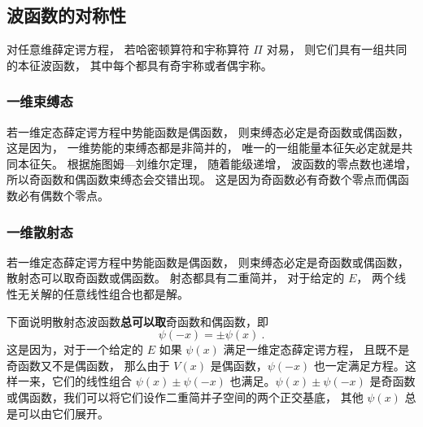 \subsection{波函数的对称性}
对任意维薛定谔方程， 若哈密顿算符和宇称算符 $\Pi$ 对易， 则它们具有一组共同的本征波函数， 其中每个都具有奇宇称或者偶宇称。

\subsubsection{一维束缚态}
若一维定态薛定谔方程中势能函数是偶函数， 则束缚态必定是奇函数或偶函数， 这是因为， 一维势能的束缚态都是非简并的， 唯一的一组能量本征矢必定就是共同本征矢。 根据施图姆—刘维尔定理， 随着能级递增， 波函数的零点数也递增， 所以奇函数和偶函数束缚态会交错出现。 这是因为奇函数必有奇数个零点而偶函数必有偶数个零点。

\subsubsection{一维散射态}
若一维定态薛定谔方程中势能函数是偶函数， 则束缚态必定是奇函数或偶函数， 散射态可以取奇函数或偶函数。 射态都具有二重简并， 对于给定的 $E$， 两个线性无关解的任意线性组合也都是解。

下面说明散射态波函数\textbf{总可以取}奇函数和偶函数，即
\begin{equation}\label{eq_SchEq_3}
\psi(-x) = \pm \psi(x)~.
\end{equation}
这是因为，对于一个给定的 $E$ 如果 $\psi(x)$ 满足一维定态薛定谔方程， 且既不是奇函数又不是偶函数， 那么由于 $V(x)$ 是偶函数，$\psi(-x)$ 也一定满足方程。这样一来，它们的线性组合 $\psi(x)\pm\psi(-x)$ 也满足。$\psi(x)\pm \psi(-x)$ 是奇函数或偶函数，我们可以将它们设作二重简并子空间的两个正交基底， 其他 $\psi(x)$ 总是可以由它们展开。
